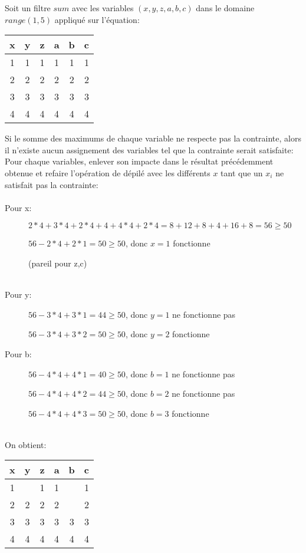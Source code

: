 Soit un filtre $sum$ avec les variables $(x,y,z,a,b,c)$ dans le domaine $range(1,5)$ appliqué sur l'équation:
\begin{center}
\begin{tabular}{cccccc}
x&y&z&a&b&c\\ \hline
1&1&1&1&1&1\\ 2&2&2&2&2&2\\ 3&3&3&3&3&3\\ 4&4&4&4&4&4\\
\end{tabular}
\end{center}
Si le somme des maximums de chaque variable ne respecte pas la contrainte, alors il n'existe aucun assignement des variables tel que la contrainte serait satisfaite:
Pour chaque variables, enlever son impacte dans le résultat précédemment obtenue et refaire l'opération de dépilé avec les différents $x$ tant que un $x_i$ ne satisfait pas la contrainte:\\
\ \\
Pour x:
\begin{description}
\item[] $2*4+3*4+2*4+4+4*4+2*4 = 8+12+8+4+16+8 = 56 \geq 50$
\item[] $ 56 - 2*4 + 2*1 = 50 \geq 50$, donc $x=1$ fonctionne
\item[] (pareil pour z,c)
\end{description}
\ \\
Pour y:
\begin{description}
\item[] $ 56 - 3*4 + 3*1 = 44 \geq 50$, donc $y=1$  ne fonctionne pas
\item[] $ 56 - 3*4 + 3*2 = 50 \geq 50$, donc $y=2$  fonctionne
\end{description}
\pagebreak
Pour b:
\begin{description}
\item[] $ 56 - 4*4 + 4*1 = 40 \geq 50$, donc $b=1$  ne fonctionne pas
\item[] $ 56 - 4*4 + 4*2 = 44 \geq 50$, donc $b=2$  ne fonctionne pas
\item[] $ 56 - 4*4 + 4*3 = 50 \geq 50$, donc $b=3$  fonctionne
\end{description}
\ \\
On obtient:\\
\begin{center}
\begin{tabular}{cccccc}
x&y&z&a&b&c\\ \hline
1&$ $&1&1&$ $&1\\ 2&2&2&2&$ $&2\\ 3&3&3&3&3&3\\ 4&4&4&4&4&4\\
\end{tabular}
\end{center}

